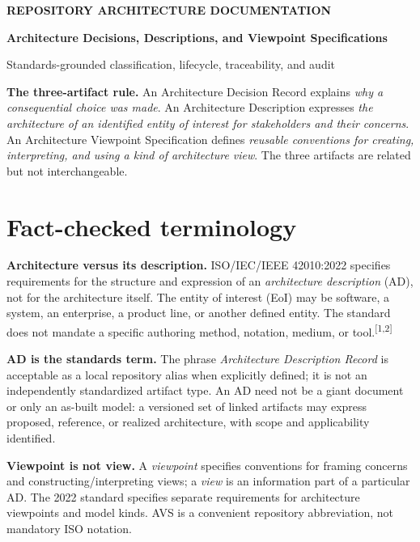 \documentclass[10pt,letterpaper]{article}
\begin{document}
{\sffamily\small\bfseries\color{Teal} REPOSITORY ARCHITECTURE DOCUMENTATION}\par
\vspace{7pt}
{\sffamily\fontsize{22}{25}\selectfont\bfseries\color{Navy}
Architecture Decisions, Descriptions, and Viewpoint Specifications\par}
\vspace{7pt}
{\large Standards-grounded classification, lifecycle, traceability, and audit}\par
{}\vspace{8pt}
\begin{principle}
\textbf{The three-artifact rule.} An Architecture Decision Record explains
\emph{why a consequential choice was made}. An Architecture Description expresses
\emph{the architecture of an identified entity of interest for stakeholders and
their concerns}. An Architecture Viewpoint Specification defines
\emph{reusable conventions for creating, interpreting, and using a kind of
architecture view}. The three artifacts are related but not interchangeable.
\end{principle}

\section{Fact-checked terminology}
\textbf{Architecture versus its description.} ISO/IEC/IEEE 42010:2022
specifies requirements for the structure and expression of an
\emph{architecture description} (AD), not for the architecture itself.
The entity of interest (EoI) may be software, a system, an enterprise,
a product line, or another defined entity. The standard does not mandate a
specific authoring method, notation, medium, or tool.\textsuperscript{[1,2]}

\textbf{AD is the standards term.} The phrase
\emph{Architecture Description Record} is acceptable as a local repository
alias when explicitly defined; it is not an independently standardized
artifact type. An AD need not be a giant document or only an as-built model:
a versioned set of linked artifacts may express proposed, reference, or
realized architecture, with scope and applicability identified.

\textbf{Viewpoint is not view.} A \emph{viewpoint} specifies conventions
for framing concerns and constructing/interpreting views; a \emph{view}
is an information part of a particular AD. The 2022 standard specifies
separate requirements for architecture viewpoints and model kinds.
AVS is a convenient repository abbreviation, not mandatory ISO notation.
\end{document}
